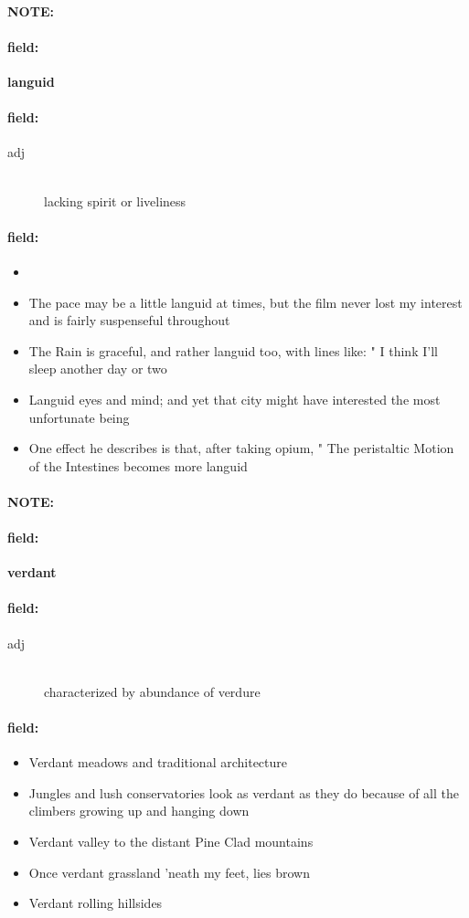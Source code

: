 \documentclass[12pt]{article}
\newenvironment{note}{\paragraph{NOTE:}}{}
\newenvironment{field}{\paragraph{field:}}{}
\begin{document}
\begin{note}
\begin{field}
\textbf{\large languid}
\end{field}


\begin{field}
\begin{description}
\item[adj] \hfill \\ 
lacking spirit or liveliness

\end{description}
\end{field}

\begin{field}
\begin{itemize}
\item 
\item The pace may be a little languid at times, but the film never lost my interest and is fairly suspenseful throughout
\item The Rain is graceful, and rather languid too, with lines like: " I think I'll sleep another day or two
\item Languid eyes and mind; and yet that city might have interested the most unfortunate being
\item One effect he describes is that, after taking opium, " The peristaltic Motion of the Intestines becomes more languid
\end{itemize}
\end{field}
\end{note}
\begin{note}
\begin{field}
\textbf{\large verdant}
\end{field}


\begin{field}
\begin{description}
\item[adj] \hfill \\ 
characterized by abundance of verdure

\end{description}
\end{field}

\begin{field}
\begin{itemize}
\item Verdant meadows and traditional architecture
\item Jungles and lush conservatories look as verdant as they do because of all the climbers growing up and hanging down
\item Verdant valley to the distant Pine Clad mountains
\item Once verdant grassland 'neath my feet, lies brown
\item Verdant rolling hillsides
\end{itemize}
\end{field}
\end{note}
\end{document}
